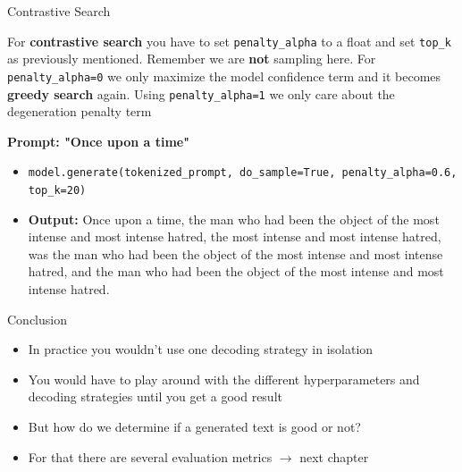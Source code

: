 
\begin{vbframe}{Contrastive Search}

\vfill

For \textbf{contrastive search} you have to set \texttt{penalty\_alpha} to a float and set \texttt{top\_k} as previously mentioned. Remember we are \textbf{not} sampling here. For \texttt{penalty\_alpha=0} we only maximize the model confidence term and it becomes \textbf{greedy search} again. Using \texttt{penalty\_alpha=1} we only care about the degeneration penalty term

\textbf{Prompt: "Once upon a time"}

\begin{itemize}
    \item \texttt{model.generate(tokenized\_prompt, do\_sample=True, penalty\_alpha=0.6, top\_k=20)}
    \item \textbf{Output:} Once upon a time, the man who had been the object of the most intense and most intense hatred, the most intense and most intense hatred, was the man who had been the object of the most intense and most intense hatred, and the man who had been the object of the most intense and most intense hatred.
\end{itemize}

\vfill
    
\end{vbframe}


\begin{vbframe}{Conclusion}

\vfill

\begin{itemize}
    \item In practice you wouldn't use one decoding strategy in isolation
    \item You would have to play around with the different hyperparameters and decoding strategies until you get a good result
    \item But how do we determine if a generated text is good or not?
    \item For that there are several evaluation metrics $\rightarrow$ next chapter
\end{itemize}


\vfill
    
\end{vbframe}

